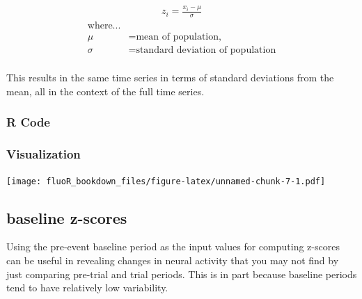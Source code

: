 \documentclass[
]{book}
\newenvironment{Shaded}{\begin{snugshade}}{\end{snugshade}}
\newcommand{\CommentTok}[1]{\textcolor[rgb]{0.56,0.35,0.01}{\textit{#1}}}
\newcommand{\DataTypeTok}[1]{\textcolor[rgb]{0.13,0.29,0.53}{#1}}
\newcommand{\KeywordTok}[1]{\textcolor[rgb]{0.13,0.29,0.53}{\textbf{#1}}}
\newcommand{\NormalTok}[1]{#1}
\newcommand{\OperatorTok}[1]{\textcolor[rgb]{0.81,0.36,0.00}{\textbf{#1}}}
\newcommand{\StringTok}[1]{\textcolor[rgb]{0.31,0.60,0.02}{#1}}
\begin{document}
\begin{gather*}
  z_{i} = \frac{x_{i}-\mu}{\sigma}
\end{gather*}
\begin{align*}
  \text{where...} \\
  \mu &= \text{mean of population,} \\
  \sigma &= \text{standard deviation of population} \\
\end{align*}

This results in the same time series in terms of standard deviations from the mean, all in the context of the full time series.

\hypertarget{stand-methods-zscore-code}{%
\subsubsection{R Code}\label{stand-methods-zscore-code}}

\begin{Shaded}
\end{Shaded}

\hypertarget{stand-methods-zscore-vis}{%
\subsubsection{Visualization}\label{stand-methods-zscore-vis}}

\texttt{[image: fluoR\_bookdown\_files/figure-latex/unnamed-chunk-7-1.pdf]}

\hypertarget{stand-methods-bzscore}{%
\subsection{baseline z-scores}\label{stand-methods-bzscore}}

Using the pre-event baseline period as the input values for computing z-scores can be useful in revealing changes in neural activity that you may not find by just comparing pre-trial and trial periods. This is in part because baseline periods tend to have relatively low variability.
\end{document}

